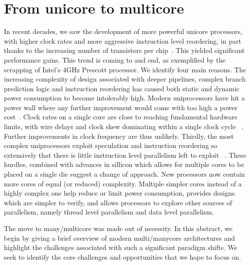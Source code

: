 \section{From unicore to multicore}

In recent decades, we saw the development of more powerful
unicore processors, with higher clock rates and more
aggressive instruction level reordering, in part
thanks to the increasing number of transistors per chip~\cite{SR97}.
 This yielded
significant performance gains. This trend is coming to and end,
 as exemplified by the scrapping of Intel's
4GHz Prescott processor. We identify
four main reasons. The increasing complexity
of design associated with deeper pipelines,
complex branch prediction logic and instruction
reordering has caused both static and dynamic power consumption
to become intolerably high. Modern uniprocessors have hit
a power wall where any further improvement would come
with too high a power cost~\cite{EH11}. Clock rates on
a single core are close to reaching fundamental hardware limits,
with wire delays and clock skew dominating within a single clock cycle ~\cite{EH11}.
Further improvements in clock frequency are thus unlikely. Thirdly, the most
complex uniprocessors exploit speculation and instruction reordering so
extensively that there is little instruction level parallelism left to
exploit ~\cite{EH11}. These hurdles, combined with advances in sillicon which allows
for multiple cores to be placed on a single die suggest a change of approach.
 New processors now contain more cores of equal (or reduced) complexity.
Multiple simpler cores instead of a highly complex one help reduce or limit power consumption,
provides designs which are simpler to verify, and allows processors
to explore other sources of parallelism, namely thread level parallelism
and data level parallelism.

The move to many/multicore was made out of necessity. In this abstract, we begin
by giving a brief overview of modern multi/manycore architectures and highlight
the challenges associated with such a significant paradigm shifts. We
seek to identify the core challenges and opportunities that we hope to focus on. 


